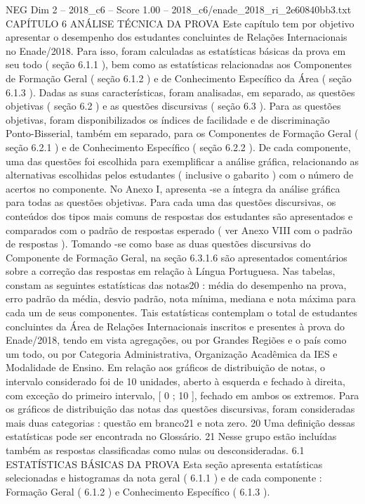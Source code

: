 \begin{textsample}{NEG Dim 2 – 2018\_c6 – Score 1.00 – 2018\_c6/enade\_2018\_ri\_2e60840bb3.txt}  \label{ex:f2_neg_241}
CAPÍTULO 6 ANÁLISE TÉCNICA DA PROVA Este capítulo tem por objetivo apresentar o desempenho dos estudantes concluintes de Relações Internacionais no Enade/2018.
Para isso, foram calculadas as estatísticas básicas da prova em seu todo ( seção 6.1.1 ), bem como as estatísticas relacionadas aos Componentes de Formação Geral ( seção 6.1.2 ) e de Conhecimento Específico da Área ( seção 6.1.3 ).
Dadas as suas características, foram analisadas, em separado, as questões objetivas ( seção 6.2 ) e as questões discursivas ( seção 6.3 ).
Para as questões objetivas, foram disponibilizados os índices de facilidade e de discriminação Ponto-Bisserial, também em separado, para os Componentes de Formação Geral ( seção 6.2.1 ) e de Conhecimento Específico ( seção 6.2.2 ).
De cada componente, uma das questões foi escolhida para exemplificar a análise gráfica, relacionando as alternativas escolhidas pelos estudantes ( inclusive o gabarito ) com o número de acertos no componente.
No Anexo I, apresenta -se a íntegra da análise gráfica para todas as questões objetivas.
Para cada uma das questões discursivas, os conteúdos dos tipos mais comuns de respostas dos estudantes são apresentados e comparados com o padrão de respostas esperado ( ver Anexo VIII com o padrão de respostas ).
Tomando -se como base as duas questões discursivas do Componente de Formação Geral, na seção 6.3.1.6 são apresentados comentários sobre a correção das respostas em relação à Língua Portuguesa.
Nas tabelas, constam as seguintes estatísticas das notas20 : média do desempenho na prova, erro padrão da média, desvio padrão, nota mínima, mediana e nota máxima para cada um de seus componentes.
Tais estatísticas contemplam o total de estudantes concluintes da Área de Relações Internacionais inscritos e presentes à prova do Enade/2018, tendo em vista agregações, ou por Grandes Regiões e o país como um todo, ou por Categoria Administrativa, Organização Acadêmica da IES e Modalidade de Ensino.
Em relação aos gráficos de distribuição de notas, o intervalo considerado foi de 10 unidades, aberto à esquerda e fechado à direita, com exceção do primeiro intervalo, [ 0 ; 10 ], fechado em ambos os extremos.
Para os gráficos de distribuição das notas das questões discursivas, foram consideradas mais duas categorias : questão em branco21 e nota zero. 20 Uma definição dessas estatísticas pode ser encontrada no Glossário. 21 Nesse grupo estão incluídas também as respostas classificadas como nulas ou desconsideradas. 6.1 ESTATÍSTICAS BÁSICAS DA PROVA Esta seção apresenta estatísticas selecionadas e histogramas da nota geral ( 6.1.1 ) e de cada componente : Formação Geral ( 6.1.2 ) e Conhecimento Específico ( 6.1.3 ).

\end{textsample}
